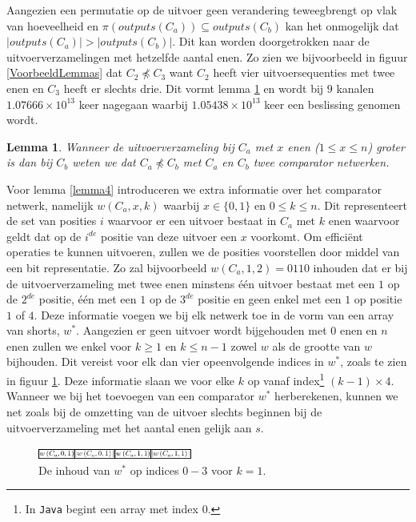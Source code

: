 \documentclass{article}
\newtheorem{lemma}{Lemma}
\begin{document}
Aangezien een permutatie op de uitvoer geen verandering teweegbrengt op vlak van hoeveelheid en ${\pi(outputs(C_a)) \subseteq outputs(C_b)}$ kan het onmogelijk dat ${|outputs(C_a)| > |outputs(C_b)|}$.
Dit kan worden doorgetrokken naar de uitvoerverzamelingen met hetzelfde aantal enen.
Zo zien we bijvoorbeeld in figuur \ref{VoorbeeldLemmas} dat $C_2 \npreceq C_3$ want $C_2$ heeft vier uitvoersequenties met twee enen en $C_3$ heeft er slechts drie.
Dit vormt lemma \ref{lemma3} en wordt bij $9$ kanalen $1.07666 \times 10^{13}$ keer nagegaan waarbij $1.05438 \times 10^{13}$ keer een beslissing genomen wordt.
\begin{lemma}
	Wanneer de uitvoerverzameling bij $C_a$ met $x$ enen ($1 \leq x \leq n$) groter is dan bij $C_b$ weten we dat $C_a \npreceq C_b$ met $C_a$ en $C_b$ twee comparator netwerken.
\label{lemma3}
\end{lemma}
Voor lemma \ref{lemma4} introduceren we extra informatie over het comparator netwerk, namelijk $w\left(C_a, x, k\right)$ waarbij ${x \in \{0,1\}}$ en $0\leq k \leq n$.
Dit representeert de set van posities $i$ waarvoor er een uitvoer bestaat in $C_a$ met $k$ enen waarvoor geldt dat op de $i^{de}$ positie van deze uitvoer een $x$ voorkomt.
Om effici\"ent operaties te kunnen uitvoeren, zullen we de posities voorstellen door middel van een bit representatie.
Zo zal bijvoorbeeld $w\left(C_a, 1, 2\right) = 0110$ inhouden dat er bij de uitvoerverzameling met twee enen minstens \'e\'en uitvoer bestaat met een $1$ op de $2^{de}$ positie, \'e\'en met een $1$ op de $3^{de}$ positie en geen enkel met een $1$ op positie $1$ of $4$.
Deze informatie voegen we bij elk netwerk toe in de vorm van een array van shorts, $w^*$.
Aangezien er geen uitvoer wordt bijgehouden met $0$ enen en $n$ enen zullen we enkel voor $k \geq 1 $ en $k \leq n-1$ zowel $w$ als de grootte van $w$ bijhouden.
Dit vereist voor elk dan vier opeenvolgende indices in $w^*$, zoals te zien in figuur \ref{tabel3}.
Deze informatie slaan we voor elke $k$ op vanaf index\footnote{In \texttt{Java} begint een array met index $0$.} $(k-1) \times 4$.
Wanneer we bij het toevoegen van een comparator $w^*$ herberekenen, kunnen we net zoals bij de omzetting van de uitvoer slechts beginnen bij de uitvoerverzameling met het aantal enen gelijk aan $s$.
\begin{figure}[!h]
	\centering
	\includegraphics[width = 0.45\textwidth]{Tabel3_OpbouwW.png}
	\caption{De inhoud van $w^*$ op indices $0-3$ voor $k = 1$.}
	\label{tabel3} 
\end{figure}
\end{document}
